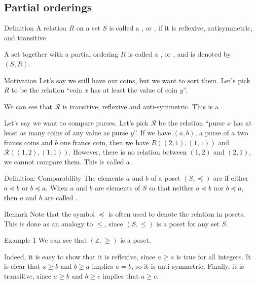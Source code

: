 \documentclass[a4paper]{article}
\begin{document}
\subsection{Partial orderings}
\begin{parag}{Definition}
    A relation $R$ on a set $S$ is called a , or , if it is reflexive, antisymmetric, and transitive

    A set together with a partial ordering $R$ is called a , or , and is denoted by $\left(S, R\right)$.

    \begin{subparag}{Motivation}
        Let's say we still have our coins, but we want to sort them. Let's pick $R$ to be the relation ``coin $x$ has at least the value of coin $y$''.

        We can see that $\mathcal{R}$ is transitive, reflexive and anti-symmetric. This is a .

        Let's say we want to compare purses. Let's pick $\mathcal{R}$ be the relation ``purse $x$ has at least as many coins of any value as purse $y$''. If we have $\left(a, b\right)$, a purse of $a$ two francs coins and $b$ one francs coin, then we have $R\left(\left(2,1\right), \left(1, 1\right)\right)$ and $\mathcal{R\left(\left(1,2\right), \left(1,1\right)\right)}$. However, there is no relation between $\left(1, 2\right)$ and $\left(2, 1\right)$, we cannot compare them.  This is called a .
    \end{subparag}
\end{parag}

\begin{parag}{Definition: Comparability}
    The elements $a$ and $b$ of a poset $\left(S, \preccurlyeq\right)$ are  if either $a \preccurlyeq b$ or $b \preccurlyeq a$. When $a$ and $b$ are elements of $S$ so that neither $a \preccurlyeq b$ nor $b \preccurlyeq a$, then $a$ and $b$ are called .

    \begin{subparag}{Remark}
        Note that the symbol $\preccurlyeq$ is often used to denote the relation in posets. This is done as an analogy to $\leq$, since $\left(S, \leq\right)$ is a poset for any set $S$.
    \end{subparag}
\end{parag}

\begin{parag}{Example 1}
    We can see that $\left(\mathbb{Z}, \geq\right)$ is a poset.

    Indeed, it is easy to show that it is reflexive, since $a \geq a$ is true for all integers. It is clear that $a\geq b$ and $b \geq a$ implies $a = b$, so it is anti-symmetric. Finally, it is transitive, since $a \geq b$ and $b \geq c$ implies that $a \geq c$.
\end{parag}
\end{document}
